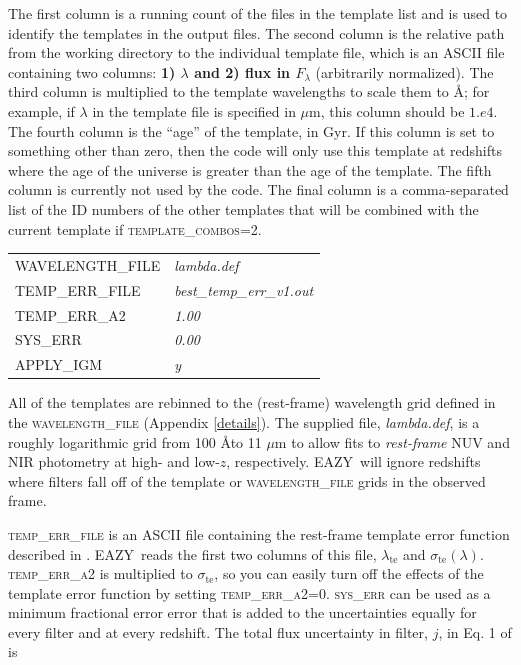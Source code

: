 \documentclass[11pt]{article}
\newcommand{\eazy}{\textsc{EAZY}}
\begin{document}
The first column is a running count of the files in the template list and is
used to identify the templates in the output files.  The second column is the
relative path from the working directory to the individual template file, which
is an ASCII file containing two columns: \textbf{1) $\lambda$ and 2) flux in
$F_\lambda$} (arbitrarily normalized).  The third column is multiplied to the
template wavelengths to scale them to \AA;  for example, if $\lambda$ in the
template file is specified in $\mu$m, this column should be $1.e4$.  The fourth
column is the ``age'' of the template, in Gyr.  If this column is set to
something other than zero, then the code will only use this template at
redshifts where the age of the universe is greater than the age of the
template.  The fifth column is currently not used by the code.  The final column is
a comma-separated list of the ID numbers of the other templates that will be
combined with the current template if \textsc{template\_combos}=2.

\vspace*{0.5cm}
\begin{tabular}{ll} 
 \textsc{WAVELENGTH\_FILE } & \textsl{     lambda.def       } \\
 \textsc{TEMP\_ERR\_FILE} & \textsl{       best\_temp\_err\_v1.out } \\
 \textsc{TEMP\_ERR\_A2 } & \textsl{         1.00              } \\
 \textsc{SYS\_ERR    } & \textsl{          0.00               } \\
 \textsc{APPLY\_IGM   } & \textsl{         y                  } \\
\end{tabular}

\vspace*{0.25cm}All of the templates are rebinned to the (rest-frame)
wavelength grid defined in the \textsc{wavelength\_file} (Appendix
\ref{details}).  The supplied file, \textit{lambda.def}, is a roughly
logarithmic grid from 100 \AA to 11 $\mu$m to allow fits to \textit{rest-frame}
NUV and NIR photometry at high- and low-$z$, respectively.  \eazy\ will ignore
redshifts where filters fall off of the template or \textsc{wavelength\_file}
grids in the observed frame.

\textsc{temp\_err\_file} is an ASCII file containing the rest-frame template
error function described in \cite{eazy_paper}.  \eazy\ reads the first two
columns of this file, $\lambda_\mathrm{te}$ and $\sigma_\mathrm{te}(\lambda)$. 
\textsc{temp\_err\_a2} is multiplied to $\sigma_\mathrm{te}$, so you can easily
turn off the effects of the template error function by setting
\textsc{temp\_err\_a2}=0.  \textsc{sys\_err} can be used as a minimum
fractional error error that is added to the uncertainties equally for every
filter and at every redshift.  The total flux uncertainty in filter, $j$, in
Eq. 1 of \cite{eazy_paper} is 
\end{document}
